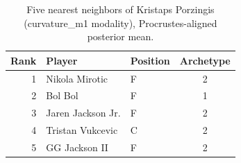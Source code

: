\begin{table}[htbp]
  \centering\small
  \begin{tabular}{rllc}
    \toprule
    Rank & Player & Position & Archetype \\
    \midrule
    1 & Nikola Mirotic & F & 2 \\
    2 & Bol Bol & F & 1 \\
    3 & Jaren Jackson Jr. & F & 2 \\
    4 & Tristan Vukcevic & C & 2 \\
    5 & GG Jackson II & F & 2 \\
    \bottomrule
  \end{tabular}
  \caption{Five nearest neighbors of Kristaps Porzingis (curvature_m1 modality), Procrustes-aligned posterior mean.}
  \label{tab:Kristaps_Porzingis_neighbors_curvature_m1}
\end{table}

